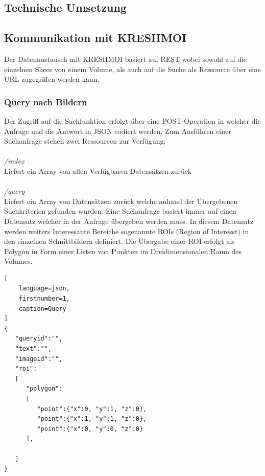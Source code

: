 \subsection{Technische Umsetzung}
\label{sec:Technische Umsetzung}


\subsection{Kommunikation mit KRESHMOI}
\label{sec:Kommunikation mit KRESHMOI}
Der Datenaustausch mit KRESHMOI basiert auf REST wobei sowohl auf die einzelnen Slices von einem Volume, als auch auf die Suche als Ressource über eine URL zugegriffen werden kann.

\subsubsection{Query nach Bildern}
\label{sec:Query nach Bildern}
Der Zugriff auf die Suchfunktion erfolgt über eine POST-Operation in welcher die Anfrage und die Antwort in JSON codiert werden.
Zum Ausführen einer Suchanfrage stehen zwei Ressourcen zur Verfügung:
\\
\\
\textit{/index}\\
Liefert ein Array von allen Verfügbaren Datensätzen zurück 
\\
\\
\textit{/query}\\
Liefert ein Array von Datensätzen zurück welche anhand der Übergebenen Suchkriterien gefunden wurden.
Eine Suchanfrage basiert immer auf einen Datensatz welcher in der Anfrage übergeben werden muss.
In diesem Datensatz werden weiters Interessante Bereiche sogenannte ROIs (Region of Interesst) in den einzelnen Schnittbildern definiert.
Die Übergabe einer ROI erfolgt als Polygon in Form einer Listen von Punkten im Dreidimensionalen Raum des Volumes.
\begin{lstlisting}[
	language=json,
	firstnumber=1,
	caption=Query
]
{
   "queryid":"",
   "text":"",
   "imageid":"",
   "roi": 
   [
      "polygon":
      [
         "point":{"x":0, "y":1, "z":0},
         "point":{"x":1, "y":1, "z":0},
         "point":{"x":0, "y":0, "z":0}
      ],

   ]
}
\end{lstlisting}


